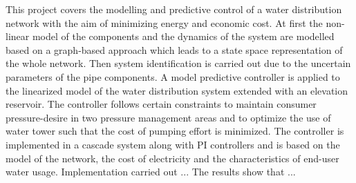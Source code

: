 This project covers the modelling and predictive control of a water distribution network with the aim of minimizing energy and economic cost. 
\newline
At first the non-linear model of the components and the dynamics of the system are modelled based on a graph-based approach which leads to a state space representation of the whole network. Then system identification is carried out due to the uncertain parameters of the pipe components. 
\newline
A model predictive controller is applied to the linearized model of the water distribution system extended with an elevation reservoir. The controller follows certain constraints to maintain consumer pressure-desire in two pressure management areas and to optimize the use of water tower such that the cost of pumping effort is minimized. 
The controller is implemented in a cascade system along with PI controllers and is based on the model of the network, the cost of electricity and the characteristics of end-user water usage. 
\newline
Implementation carried out ...
\newline
The results show that ...